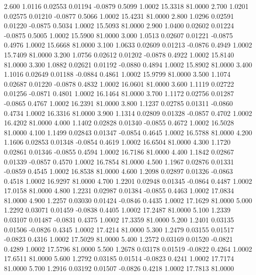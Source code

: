    2.600   1.0116   0.02553   0.01194  -0.0879   0.5099   1.0002  15.3318  81.0000
   2.700   1.0201   0.02575   0.01210  -0.0877   0.5066   1.0002  15.4231  81.0000
   2.800   1.0296   0.02591   0.01220  -0.0875   0.5034   1.0002  15.5093  81.0000
   2.900   1.0400   0.02602   0.01224  -0.0875   0.5005   1.0002  15.5900  81.0000
   3.000   1.0513   0.02607   0.01221  -0.0875   0.4976   1.0002  15.6668  81.0000
   3.100   1.0633   0.02609   0.01213  -0.0876   0.4949   1.0002  15.7409  81.0000
   3.200   1.0756   0.02612   0.01202  -0.0878   0.4922   1.0002  15.8140  81.0000
   3.300   1.0882   0.02621   0.01192  -0.0880   0.4894   1.0002  15.8902  81.0000
   3.400   1.1016   0.02649   0.01188  -0.0884   0.4861   1.0002  15.9799  81.0000
   3.500   1.1074   0.02687   0.01220  -0.0878   0.4832   1.0002  16.0601  81.0000
   3.600   1.1119   0.02722   0.01256  -0.0871   0.4801   1.0002  16.1464  81.0000
   3.700   1.1172   0.02756   0.01287  -0.0865   0.4767   1.0002  16.2391  81.0000
   3.800   1.1237   0.02785   0.01311  -0.0860   0.4734   1.0002  16.3316  81.0000
   3.900   1.1314   0.02809   0.01328  -0.0857   0.4702   1.0002  16.4202  81.0000
   4.000   1.1402   0.02828   0.01340  -0.0855   0.4672   1.0002  16.5028  81.0000
   4.100   1.1499   0.02843   0.01347  -0.0854   0.4645   1.0002  16.5788  81.0000
   4.200   1.1606   0.02853   0.01348  -0.0854   0.4619   1.0002  16.6504  81.0000
   4.300   1.1720   0.02861   0.01346  -0.0855   0.4594   1.0002  16.7186  81.0000
   4.400   1.1842   0.02867   0.01339  -0.0857   0.4570   1.0002  16.7854  81.0000
   4.500   1.1967   0.02876   0.01331  -0.0859   0.4545   1.0002  16.8538  81.0000
   4.600   1.2098   0.02897   0.01326  -0.0863   0.4518   1.0002  16.9297  81.0000
   4.700   1.2201   0.02948   0.01345  -0.0864   0.4487   1.0002  17.0158  81.0000
   4.800   1.2231   0.02987   0.01384  -0.0855   0.4463   1.0002  17.0834  81.0000
   4.900   1.2257   0.03030   0.01424  -0.0846   0.4435   1.0002  17.1629  81.0000
   5.000   1.2292   0.03071   0.01459  -0.0838   0.4405   1.0002  17.2487  81.0000
   5.100   1.2339   0.03107   0.01487  -0.0831   0.4375   1.0002  17.3359  81.0000
   5.200   1.2401   0.03135   0.01506  -0.0826   0.4345   1.0002  17.4214  81.0000
   5.300   1.2479   0.03155   0.01517  -0.0823   0.4316   1.0002  17.5029  81.0000
   5.400   1.2572   0.03169   0.01520  -0.0821   0.4289   1.0002  17.5796  81.0000
   5.500   1.2678   0.03178   0.01519  -0.0822   0.4264   1.0002  17.6511  81.0000
   5.600   1.2792   0.03185   0.01514  -0.0823   0.4241   1.0002  17.7174  81.0000
   5.700   1.2916   0.03192   0.01507  -0.0826   0.4218   1.0002  17.7813  81.0000
